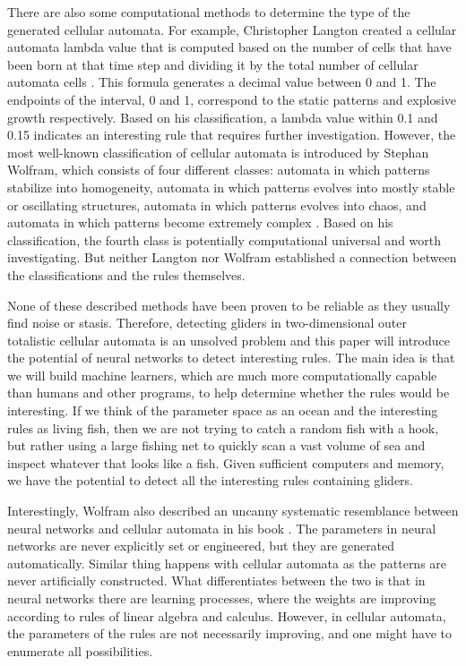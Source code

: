 \documentclass[12pt]{article}
\numberwithin{figure}{section} %
\begin{document}
There are also some computational methods to determine the type of the generated cellular automata. For example, Christopher Langton created a cellular automata lambda value that is computed based on the number of cells that have been born at that time step and dividing it by the total number of cellular automata cells \cite{Edge of Chaos}. This formula generates a decimal value between 0 and 1. The endpoints of the interval, 0 and 1, correspond to the static patterns and explosive growth respectively. Based on his classification, a lambda value within 0.1 and 0.15 indicates an interesting rule that requires further investigation. However, the most well-known classification of cellular automata is introduced by Stephan Wolfram, which consists of four different classes: automata in which patterns stabilize into homogeneity, automata in which patterns evolves into mostly stable or oscillating structures, automata in which patterns evolves into chaos, and automata in which patterns become extremely complex \cite{Cellular automaton}. Based on his classification, the fourth class is potentially computational universal and worth investigating. But neither Langton nor Wolfram established a connection between the classifications and the rules themselves.  

None of these described methods have been proven to be reliable as they usually find noise or stasis. Therefore, detecting gliders in two-dimensional outer totalistic cellular automata is an unsolved problem and this paper will introduce the potential of neural networks to detect interesting rules. The main idea is that we will build machine learners, which are much more computationally capable than humans and other programs, to help determine whether the rules would be interesting. If we think of the parameter space as an ocean and the interesting rules as living fish, then we are not trying to catch a random fish with a hook, but rather using a large fishing net to quickly scan a vast volume of sea and inspect whatever that looks like a fish. Given sufficient computers and memory, we have the potential to detect all the interesting rules containing gliders. 

Interestingly, Wolfram also described an uncanny systematic resemblance between neural networks and cellular automata in his book \cite{A new kind of Science}. The parameters in neural networks are never explicitly set or engineered, but they are generated automatically. Similar thing happens with cellular automata as the patterns are never artificially constructed. What differentiates between the two is that in neural networks there are learning processes, where the weights are improving according to rules of linear algebra and calculus. However, in cellular automata, the parameters of the rules are not necessarily improving, and one might have to enumerate all possibilities.
\end{document}
